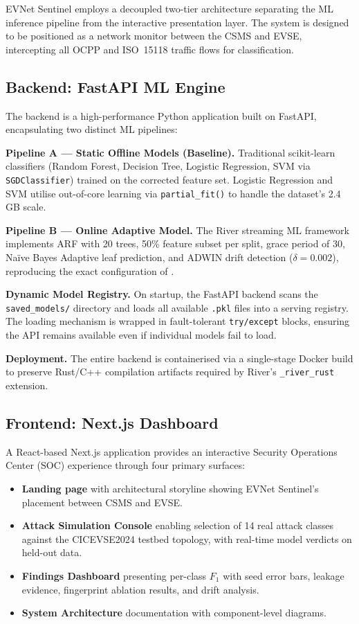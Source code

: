 \documentclass[conference]{IEEEtran}
\newcommand{\col}[1]{\texttt{\small #1}}
\begin{document}
EVNet Sentinel employs a decoupled two-tier architecture separating the ML inference pipeline from the interactive presentation layer. The system is designed to be positioned as a network monitor between the CSMS and EVSE, intercepting all OCPP and ISO~15118 traffic flows for classification.

\subsection{Backend: FastAPI ML Engine}

The backend is a high-performance Python application built on FastAPI, encapsulating two distinct ML pipelines:

\textbf{Pipeline A --- Static Offline Models (Baseline).} Traditional scikit-learn classifiers (Random Forest, Decision Tree, Logistic Regression, SVM via \col{SGDClassifier}) trained on the corrected feature set. Logistic Regression and SVM utilise out-of-core learning via \col{partial\_fit()} to handle the dataset's 2.4\,GB scale.

\textbf{Pipeline B --- Online Adaptive Model.} The River streaming ML framework implements ARF with 20 trees, 50\% feature subset per split, grace period of 30, Na\"ive Bayes Adaptive leaf prediction, and ADWIN drift detection ($\delta = 0.002$), reproducing the exact configuration of \cite{b4}.

\textbf{Dynamic Model Registry.} On startup, the FastAPI backend scans the \col{saved\_models/} directory and loads all available \col{.pkl} files into a serving registry. The loading mechanism is wrapped in fault-tolerant \col{try/except} blocks, ensuring the API remains available even if individual models fail to load.

\textbf{Deployment.} The entire backend is containerised via a single-stage Docker build to preserve Rust/C++ compilation artifacts required by River's \col{\_river\_rust} extension.

\subsection{Frontend: Next.js Dashboard}

A React-based Next.js application provides an interactive Security Operations Center (SOC) experience through four primary surfaces:

\begin{itemize}
    \item \textbf{Landing page} with architectural storyline showing EVNet Sentinel's placement between CSMS and EVSE.
    \item \textbf{Attack Simulation Console} enabling selection of 14 real attack classes against the CICEVSE2024 testbed topology, with real-time model verdicts on held-out data.
    \item \textbf{Findings Dashboard} presenting per-class $F_1$ with seed error bars, leakage evidence, fingerprint ablation results, and drift analysis.
    \item \textbf{System Architecture} documentation with component-level diagrams.
\end{itemize}
\end{document}
